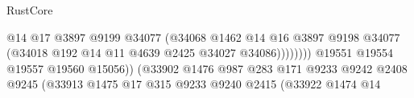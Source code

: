 \begin{lexlean}{RustCore}
\begin{coremodule}
                                                            @14
                                                            @17
                                                            @3897
                                                            @9199
                                                            @34077
                                                            (@34068
                                                              @1462
                                                              @14
                                                              @16
                                                              @3897
                                                              @9198
                                                              @34077
                                                              (@34018
                                                                @192
                                                                @14
                                                                @11
                                                                @4639
                                                                @2425
                                                                @34027
                                                                @34086))))))))
                                                @19551
                                                @19554
                                                @19557
                                                @19560
                                                @15056))
                                            (@33902
                                              @1476
                                              @987
                                              @283
                                              @171
                                              @9233
                                              @9242
                                              @2408
                                              @9245
                                              (@33913
                                                @1475
                                                @17
                                                @315
                                                @9233
                                                @9240
                                                @2415
                                                (@33922
                                                  @1474
                                                  @14

\end{coremodule}
\end{lexlean}
